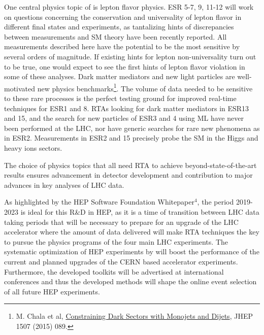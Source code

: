 One central physics topic of \acronym is
lepton flavor physics. ESR 5-7, 9, 11-12 will work on questions concerning
the conservation and universality of lepton flavor in different final states and experiments,
as tantalizing hints of discrepancies between
measurements and SM theory have been recently reported. 
All measurements described here have the potential to be the most
sensitive by several orders of
magnitude. 
If existing hints for lepton non-universality turn out to be true, 
one would expect to see the first hints of lepton flavor violation in
some of these analyses. 
Dark matter mediators and new light particles
are well-motivated new physics benchmarks\footnote{M. Chala et al,
\href{http://arxiv.org/abs/1503.05916}{Constraining Dark Sectors with Monojets and Dijets}, JHEP 1507 (2015) 089.}.
The volume of data needed to be sensitive to these rare processes is
the perfect testing ground for improved real-time techniques for ESR1 and 8.  
RTAs looking for dark matter mediators in ESR13 and 15, and the
search for new particles of ESR3 and 4 using ML
have never been performed at the LHC, 
nor have generic searches for rare new phenomena as in ESR2.
Measurements in ESR2 and 15 precisely probe the SM 
in the Higgs and heavy ions sectors. 

The choice of physics topics that all need RTA to achieve beyond-state-of-the-art results 
ensures advancement in detector development and contribution to
major advances in key analyses of LHC data.

As highlighted by the HEP Software Foundation Whitepaper$^{4}$,
the period 2019-2023 is ideal for this R\&D in HEP, as it
is a time of transition between LHC data taking periods that 
will be necessary to prepare for
an upgrade of the LHC accelerator where the amount of data delivered 
will make RTA techniques  the key to pursue 
the physics programs of the four main LHC experiments.
The systematic optimization of HEP experiments by \acronym
will boost the performance of the
current and planned upgrades of the CERN based accelerator
experiments. Furthermore, the developed toolkits will be advertised
at international conferences and thus the developed methods will
shape the online event selection of all future HEP experiments. 

